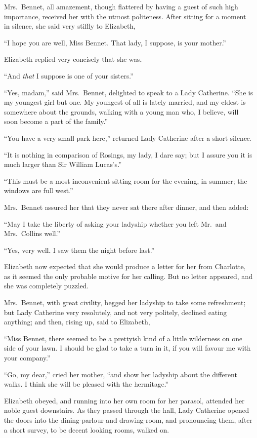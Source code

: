 Mrs.\ Bennet, all amazement, though flattered by having a
guest of such high importance, received her with the utmost
politeness.  After sitting for a moment in silence, she said
very stiffly to Elizabeth,

``I hope you are well, Miss Bennet.  That lady, I suppose,
is your mother.''

Elizabeth replied very concisely that she was.

``And \emph{that} I suppose is one of your sisters.''

``Yes, madam,'' said Mrs.\ Bennet, delighted to speak to a Lady
Catherine.  ``She is my youngest girl but one.  My youngest of
all is lately married, and my eldest is somewhere about the
grounds, walking with a young man who, I believe, will soon
become a part of the family.''

``You have a very small park here,'' returned Lady Catherine
after a short silence.

``It is nothing in comparison of Rosings, my lady, I dare say;
but I assure you it is much larger than Sir William Lucas's.''

``This must be a most inconvenient sitting room for the evening,
in summer; the windows are full west.''

Mrs.\ Bennet assured her that they never sat there after dinner,
and then added:

``May I take the liberty of asking your ladyship whether you
left Mr.\ and Mrs.\ Collins well.''

``Yes, very well.  I saw them the night before last.''

Elizabeth now expected that she would produce a letter for
her from Charlotte, as it seemed the only probable motive for
her calling.  But no letter appeared, and she was completely
puzzled.

Mrs.\ Bennet, with great civility, begged her ladyship to take
some refreshment; but Lady Catherine very resolutely, and not
very politely, declined eating anything; and then, rising up,
said to Elizabeth,

``Miss Bennet, there seemed to be a prettyish kind of a little
wilderness on one side of your lawn.  I should be glad to take
a turn in it, if you will favour me with your company.''

``Go, my dear,'' cried her mother, ``and show her ladyship about
the different walks.  I think she will be pleased with the
hermitage.''

Elizabeth obeyed, and running into her own room for her
parasol, attended her noble guest downstairs.  As they passed
through the hall, Lady Catherine opened the doors into the
dining-parlour and drawing-room, and pronouncing them, after
a short survey, to be decent looking rooms, walked on.

